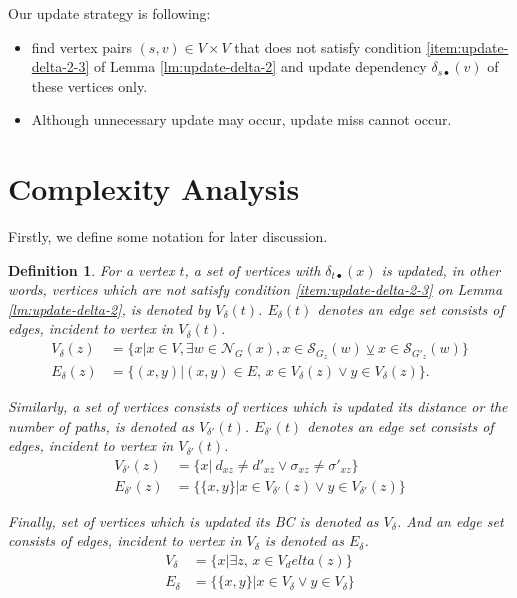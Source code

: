 \documentclass[twocolumn]{article}
\newtheorem{definition}{Definition}
\begin{document}
  Our update strategy is following:
  \begin{itemize}
  \item find vertex pairs $(s,v)\in V\times V$ that does not satisfy condition \ref{item:update-delta-2-3} of Lemma \ref{lm:update-delta-2} and update dependency $\delta_{s\bullet}(v)$ of these vertices only.
  \item Although unnecessary update may occur, update miss cannot occur.
  \end{itemize}

  \section{Complexity Analysis}
  Firstly, we define some notation for later discussion.

  \begin{definition}
    For a vertex $t$, a set of vertices with $\delta_{t\bullet}(x)$ is updated, in other words, vertices which are not satisfy condition \ref{item:update-delta-2-3} on Lemma \ref{lm:update-delta-2}, is denoted by $V_\delta(t)$.
    $E_\delta(t)$ denotes an edge set consists of edges, incident to vertex in $V_\delta(t)$.
    \begin{equation*}
      \begin{aligned}
        V_\delta(z)&=\{x|x\in V,\exists w\in\mathcal{N}_G(x),
        x\in\mathcal{S}_{G_z}(w)\veebar x\in\mathcal{S}_{G'_z}(w)\}\\
        E_\delta(z)&=\{(x,y)|(x,y)\in E,\,x\in V_\delta(z)\lor y\in V_\delta(z)\}.
      \end{aligned}
    \end{equation*}

    Similarly, a set of vertices consists of vertices which is updated its distance or the number of paths, is denoted as $V_{\delta'}(t)$.
    $E_{\delta'}(t)$ denotes an edge set consists of edges, incident to vertex in $V_{\delta'}(t)$.
    \begin{equation*}
      \begin{aligned}
        V_{\delta'}(z)&=\{x|\:d_{xz}\neq d'_{xz}\lor\sigma_{xz}\neq\sigma'_{xz}\} \\
        E_{\delta'}(z)&=\{\{x,y\}|x\in V_{\delta'}(z)\lor y\in V_{\delta'}(z)\}
      \end{aligned}
    \end{equation*}

    Finally, set of vertices which is updated its BC is denoted as $V_\delta$.
    And an edge set consists of edges, incident to vertex in $V_\delta$ is denoted as $E_\delta$.
    \begin{equation*}
      \begin{aligned}
        V_\delta&=\{x|\exists z,\,x\in V_delta(z)\} \\
        E_\delta&=\{\{x,y\}|x\in V_\delta\lor y\in V_\delta\}
      \end{aligned}
    \end{equation*}
  \end{definition}
\end{document}
